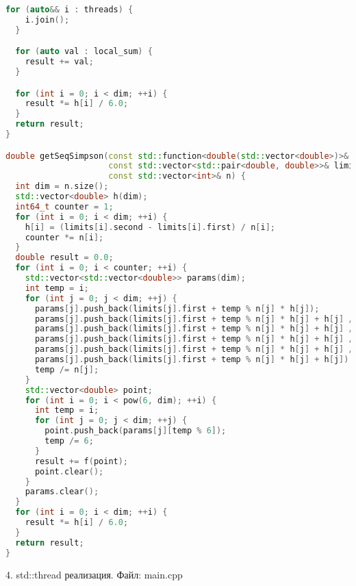 \documentclass{report}
\begin{document}
\begin{lstlisting}[language=C++]
  for (auto&& i : threads) {
    i.join();
  }

  for (auto val : local_sum) {
    result += val;
  }

  for (int i = 0; i < dim; ++i) {
    result *= h[i] / 6.0;
  }
  return result;
}

double getSeqSimpson(const std::function<double(std::vector<double>)>& f,
                     const std::vector<std::pair<double, double>>& limits,
                     const std::vector<int>& n) {
  int dim = n.size();
  std::vector<double> h(dim);
  int64_t counter = 1;
  for (int i = 0; i < dim; ++i) {
    h[i] = (limits[i].second - limits[i].first) / n[i];
    counter *= n[i];
  }
  double result = 0.0;
  for (int i = 0; i < counter; ++i) {
    std::vector<std::vector<double>> params(dim);
    int temp = i;
    for (int j = 0; j < dim; ++j) {
      params[j].push_back(limits[j].first + temp % n[j] * h[j]);
      params[j].push_back(limits[j].first + temp % n[j] * h[j] + h[j] / 2);
      params[j].push_back(limits[j].first + temp % n[j] * h[j] + h[j] / 2);
      params[j].push_back(limits[j].first + temp % n[j] * h[j] + h[j] / 2);
      params[j].push_back(limits[j].first + temp % n[j] * h[j] + h[j] / 2);
      params[j].push_back(limits[j].first + temp % n[j] * h[j] + h[j]);
      temp /= n[j];
    }
    std::vector<double> point;
    for (int i = 0; i < pow(6, dim); ++i) {
      int temp = i;
      for (int j = 0; j < dim; ++j) {
        point.push_back(params[j][temp % 6]);
        temp /= 6;
      }
      result += f(point);
      point.clear();
    }
    params.clear();
  }
  for (int i = 0; i < dim; ++i) {
    result *= h[i] / 6.0;
  }
  return result;
}
\end{lstlisting}

\par 4. std::thread реализация. Файл: main.cpp
\end{document}
